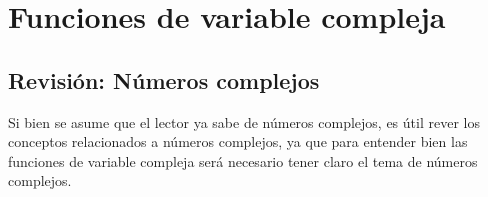 \chapter{Funciones de variable compleja}
\section{Revisión: Números complejos}

Si bien se asume que el lector ya sabe de números complejos, es útil rever los conceptos relacionados a números complejos, ya que para entender bien las funciones de variable compleja será necesario tener claro el tema de números complejos.
